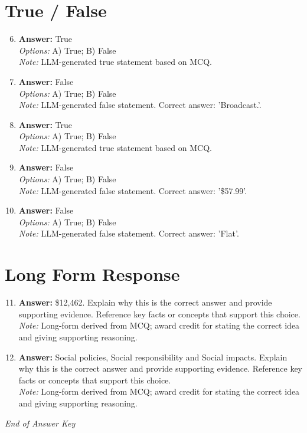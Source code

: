 \documentclass[12pt]{article}
\begin{document}
\section*{True / False}
\begin{enumerate}[label=\arabic*.]
\setcounter{enumi}{5}
\item \textbf{Answer:} True
\\ \textit{Options:} A) True; B) False
\\ \textit{Note:} LLM-generated true statement based on MCQ.
\item \textbf{Answer:} False
\\ \textit{Options:} A) True; B) False
\\ \textit{Note:} LLM-generated false statement. Correct answer: 'Broadcast.'.
\item \textbf{Answer:} True
\\ \textit{Options:} A) True; B) False
\\ \textit{Note:} LLM-generated true statement based on MCQ.
\item \textbf{Answer:} False
\\ \textit{Options:} A) True; B) False
\\ \textit{Note:} LLM-generated false statement. Correct answer: '\$57.99'.
\item \textbf{Answer:} False
\\ \textit{Options:} A) True; B) False
\\ \textit{Note:} LLM-generated false statement. Correct answer: 'Flat'.
\end{enumerate}

\section*{Long Form Response}
\begin{enumerate}[label=\arabic*.]
\setcounter{enumi}{10}
\item \textbf{Answer:} \$12,462. Explain why this is the correct answer and provide supporting evidence. Reference key facts or concepts that support this choice.
\\ \textit{Note:} Long-form derived from MCQ; award credit for stating the correct idea and giving supporting reasoning.
\item \textbf{Answer:} Social policies, Social responsibility and Social impacts. Explain why this is the correct answer and provide supporting evidence. Reference key facts or concepts that support this choice.
\\ \textit{Note:} Long-form derived from MCQ; award credit for stating the correct idea and giving supporting reasoning.
\end{enumerate}

\vfill
\noindent\textit{End of Answer Key}
\end{document}
